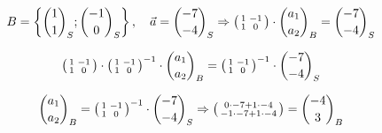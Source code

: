 \begin{example}
    $$
    B=\left\{\binom{1}{1}_{S} ;\binom{-1}{0}_{S}\right\}, \quad \vec{a}=\binom{-7}{-4}_{S} \Rightarrow \begin{psmallmatrix}
        1 & -1 \\
        1 & 0
        \end{psmallmatrix} \cdot\binom{a_{1}}{a_{2}}_{B}=\binom{-7}{-4}_{S}
    $$

    $$
    \begin{psmallmatrix} 1 & -1 \\ 1 & 0 \end{psmallmatrix} \cdot\begin{psmallmatrix} 1 & -1 \\ 1 & 0 \end{psmallmatrix}^{-1} \cdot\binom{a_{1}}{a_{2}}_{B}=\begin{psmallmatrix} 1 & -1 \\ 1 & 0 \end{psmallmatrix}^{-1} \cdot\binom{-7}{-4}_{S}
    $$

    $$
    \binom{a_{1}}{a_{2}}_{B} = \begin{psmallmatrix} 1 & -1 \\ 1 & 0 \end{psmallmatrix}^{-1} \cdot\binom{-7}{-4}_{S} 
    \Rightarrow \begin{psmallmatrix} 0 \cdot -7 + 1 \cdot -4 \\ -1 \cdot -7 + 1 \cdot -4 \end{psmallmatrix} = \binom{-4}{3}_{B}
    $$
\end{example}